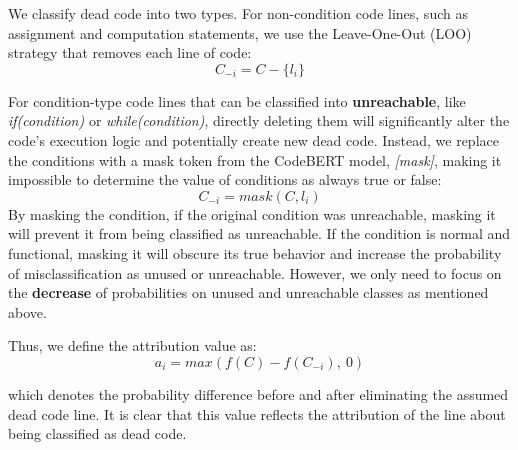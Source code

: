 \documentclass[11pt]{article}
\begin{document}
We classify dead code into two types. For non-condition code lines, such as assignment and computation statements, we use the Leave-One-Out (LOO) strategy that removes each line of code:
\begin{equation}
    C_{-i} = C - \{l_i\}
\end{equation}

For condition-type code lines that can be classified into \textbf{unreachable}, like \textit{if(condition)} or \textit{while(condition)}, directly deleting them will significantly alter the code's execution logic and potentially create new dead code. Instead, we replace the conditions with a mask token from the CodeBERT model, \textit{[mask]}, making it impossible to determine the value of conditions as always true or false:
\begin{equation}
    C_{-i} = mask(C, l_i)
\end{equation}
By masking the condition, if the original condition was unreachable, masking it will prevent it from being classified as unreachable. If the condition is normal and functional, masking it will obscure its true behavior and increase the probability of misclassification as unused or unreachable. However, we only need to focus on the \textbf{decrease} of probabilities on unused and unreachable classes as mentioned above.

Thus, we define the attribution value as:
\begin{equation}
    a_{i} = max(f(C) - f(C_{-i}),\ 0)
\end{equation}

which denotes the probability difference before and after eliminating the assumed dead code line. It is clear that this value reflects the attribution of the line about being classified as dead code.
\end{document}
